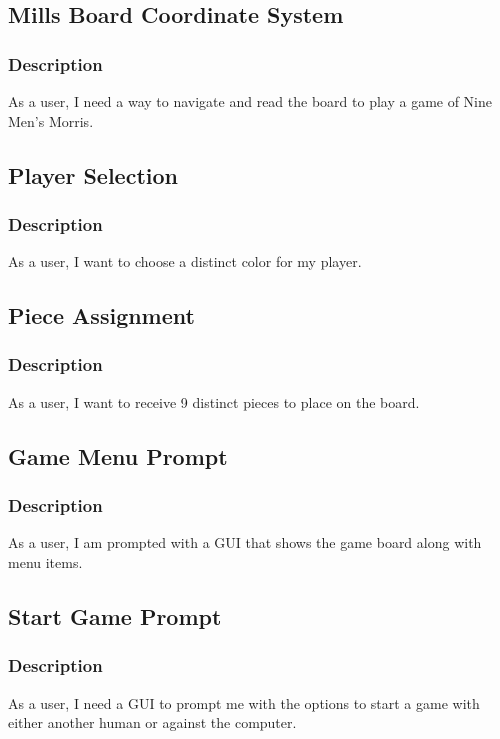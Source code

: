 \documentclass[11pt]{article}
\begin{document}
\subsection{Mills Board Coordinate System}
\label{sec:org7807149}
\subsubsection*{Description}
\label{sec:org1649a5f}
As a user, I need a way to navigate and read the board to play a game of Nine Men's Morris.
\subsection{Player Selection}
\label{sec:orgb298c6a}
\subsubsection*{Description}
\label{sec:orgec6a1ce}
As a user, I want to choose a distinct color for my player.

\subsection{Piece Assignment}
\label{sec:orgebcc56a}
\subsubsection*{Description}
\label{sec:orgcb9ec92}
As a user, I want to receive 9 distinct pieces to place on the board.
\subsection{Game Menu Prompt}
\label{sec:org2d34e67}
\subsubsection*{Description}
\label{sec:orgcc6d404}
As a user, I am prompted with a GUI that shows the game board along with menu items.

\subsection{Start Game Prompt}
\label{sec:orgc62b9a6}
\subsubsection*{Description}
\label{sec:org9d5d590}
As a user, I need a GUI to prompt me with the options to start a game with either another human
or against the computer.
\end{document}
